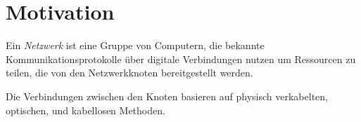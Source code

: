 \section{Motivation}%
\label{sec:motivation}

\begin{definition}[Netzwerk]
  Ein \emph{Netzwerk} ist eine Gruppe von Computern, die bekannte Kommunikationsprotokolle
  über digitale Verbindungen nutzen um Ressourcen zu teilen, die von den Netzwerkknoten
  bereitgestellt werden.

  Die Verbindungen zwischen den Knoten basieren auf physisch verkabelten, optischen, und
  kabellosen Methoden.
\end{definition}
